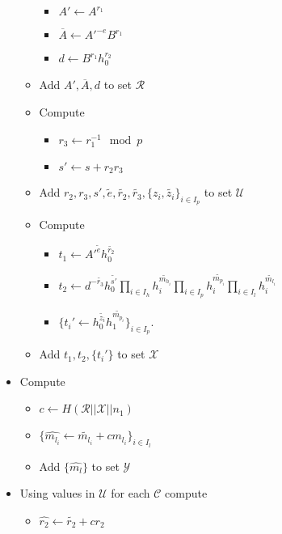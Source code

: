\documentclass[a4paper]{article}
\begin{document}
\begin{itemize}
\begin{itemize}
\begin{itemize}
                \item $A'\leftarrow A^{r_1}$
                \item $\overline{A}\leftarrow A'^{-e}B^{r_1}$
                \item $d\leftarrow B^{r_1}h_0^{r_2}$
            \end{itemize}
        \item Add $A', \overline{A}, d$ to set $\mathcal{R}$
        \item Compute     
            \begin{itemize}                \item $r_3\leftarrow r_1^{-1} \mod p$
                \item $s'\leftarrow s+r_2r_3$
            \end{itemize}
        \item Add $r_2, r_3, s' , \widetilde{e},\widetilde{r_2},\widetilde{r_3},\{z_i, \widetilde{z_i}\}_{i \in I_p}$ to set $\mathcal{U}$
        \item Compute 
        \begin{itemize}
                \item $t_1\leftarrow A'^{\widetilde{e}}h_0^{\widetilde{r_2}}$
                \item $t_2 \leftarrow  d^{-\widetilde{r_3}}h_0^{\widetilde{s'}}\prod_{i\in I_h}h_i^{\widetilde{m_{h_i}}}\prod_{i\in I_p}h_i^{\widetilde{m_{p_i}}}\prod_{i\in I_l}h_i^{\widetilde{m_{l_i}}}$
                \item $\{t_i'\leftarrow h_0^{\widetilde{z_i}}h_1^{\widetilde{m_{p_i}}}\}_{i\in I_p}$.
            \end{itemize}
        \item Add $t_1, t_2, \{t_i'\}$ to set $\mathcal{X}$
    \end{itemize}
    \item Compute 
    \begin{itemize}
        \item $c \leftarrow H(\mathcal{R}||\mathcal{X}||n_1)$
        \item $\{\widehat{m_{l_i}} \leftarrow \widetilde{m_{l_i}} + c m_{l_i}\}_{i \in I_l}$
        \item Add $\{\widehat{m_l}\}$ to set $\mathcal{Y}$
    \end{itemize}
    \item Using values in $\mathcal{U}$ for each $\mathcal{C}$ compute
    \begin{itemize}
        \item $\widehat{r_2} \leftarrow \widetilde{r_2} + c r_2$

\end{itemize}
\end{itemize}
\end{document}
